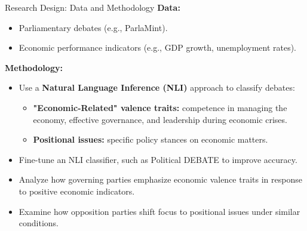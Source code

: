 \documentclass[9pt, aspectratio=169]{beamer}
\newcommand{\customcite}[1]{\textcolor{blue}{\parencite{#1}}}
\begin{document}
\begin{frame}{Research Design: Data and Methodology}
    \textbf{Data:} \vspace{0.1cm}
    \begin{itemize}
        \item Parliamentary debates (e.g., ParlaMint). \vspace{0.1cm}
        \item Economic performance indicators (e.g., GDP growth, unemployment rates). 
    \end{itemize}
    \vspace{0.3cm}
    
    \textbf{Methodology:} \vspace{0.1cm}
    \begin{itemize}
        \item Use a \textbf{Natural Language Inference (NLI)} approach to classify debates:\vspace{0.1cm}
        \begin{itemize}
            \item \textbf{"Economic-Related" valence traits:} competence in managing the economy, effective governance, and leadership during economic crises. \vspace{0.1cm}
            \item \textbf{Positional issues:} specific policy stances on economic matters. \vspace{0.1cm}
        \end{itemize}
        \item Fine-tune an NLI classifier, such as Political DEBATE \customcite{burnham2024political} to improve accuracy. \vspace{0.1cm}
        \item Analyze how governing parties emphasize economic valence traits in response to positive economic indicators. \vspace{0.1cm}
        \item Examine how opposition parties shift focus to positional issues under similar conditions.
    \end{itemize}
    \vspace{0.3cm}
\end{frame}
\end{document}
